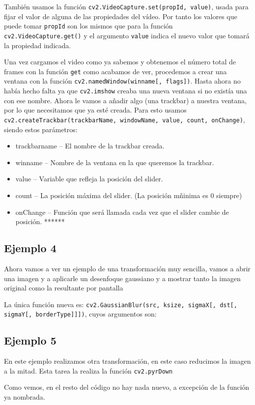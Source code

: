 \documentclass[a4paper,openright, 12pt]{book}
\begin{document}
También usamos la función \lstinline|cv2.VideoCapture.set(propId, value)|, usada para fijar el valor de alguna de las propiedades del vídeo. Por tanto los valores que puede tomar \lstinline|propId| son los mismos que para la función \lstinline|cv2.VideoCapture.get()| y el argumento \lstinline|value| indica el nuevo valor que tomará la propiedad indicada.

Una vez cargamos el video como ya sabemos y obtenemos el número total de frames con la función \lstinline|get| como acabamos de ver, procedemos a crear una ventana con la función \lstinline|cv2.namedWindow(winname[, flags])|.
Hasta ahora no había hecho falta ya que \lstinline|cv2.imshow| creaba una nueva ventana si no existía una con ese nombre.
Ahora le vamos a añadir algo (una trackbar) a nuestra ventana, por lo que necesitamos que ya esté creada.
Para esto usamos \lstinline|cv2.createTrackbar(trackbarName, windowName, value, count, onChange)|, siendo estos parámetros:
\begin{itemize}
 \item trackbarname – El nombre de la trackbar creada.
 \item winname – Nombre de la ventana en la que queremos la trackbar.
 \item value – Variable que refleja la posición del slider.
 \item count – La posición máxima del slider. (La posición mñinima es 0 siempre)
 \item onChange – Función que será llamada cada vez que el slider cambie de posición.
 \newline
 ******
\end{itemize}

\newpage

\subsection*{Ejemplo 4}
Ahora vamos a ver un ejemplo de una transformación muy sencilla, vamos a abrir una imagen y a aplicarle un desenfoque gaussiano y a mostrar tanto la imagen original como la resultante por pantalla

La única función nueva es:
\newline
\lstinline|cv2.GaussianBlur(src, ksize, sigmaX[, dst[, sigmaY[, borderType]]])|, cuyos argumentos son:




\newpage

\subsection*{Ejemplo 5}
En este ejemplo realizamos otra transformación, en este caso reducimos la imagen a la mitad. Esta tarea la realiza la función \lstinline|cv2.pyrDown|

Como vemos, en el resto del código no hay nada nuevo, a excepción de la función ya nombrada.
\newpage
\end{document}
